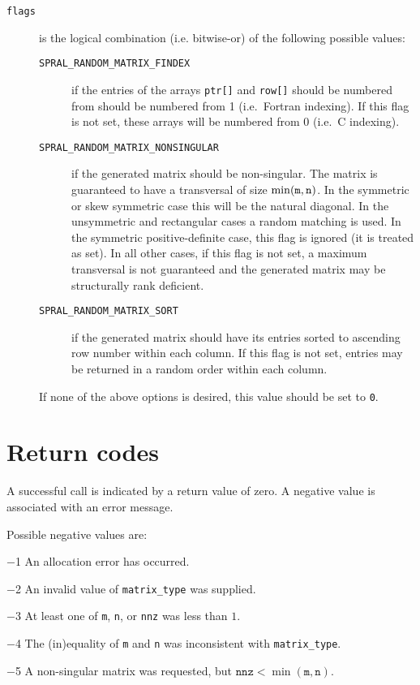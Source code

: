 \begin{description}
\item[\texttt{flags}] is the logical combination (i.e. bitwise-or) of
   the following possible values:
   \begin{description}
      \item[\texttt{SPRAL\_RANDOM\_MATRIX\_FINDEX}] if the entries of the arrays
         \texttt{ptr[]} and \texttt{row[]} should be numbered from should be
         numbered from 1 (i.e.\ Fortran indexing). If this flag is not
         set, these arrays will be numbered from 0 (i.e.\ C indexing).
      \item[\texttt{SPRAL\_RANDOM\_MATRIX\_NONSINGULAR}] if the generated matrix
         should be non-singular. The matrix is guaranteed to have a
         transversal of size $\min({\tt m}, {\tt n})$. In the symmetric or skew
         symmetric case this will be the natural diagonal. In the unsymmetric
         and rectangular cases a random matching is used. In the symmetric
         positive-definite case, this flag is ignored (it is treated as set).
         In all other cases, if this flag is not set, a maximum transversal is
         not guaranteed and the generated matrix may be structurally rank
         deficient.
      \item[\texttt{SPRAL\_RANDOM\_MATRIX\_SORT}] if the generated matrix should
         have its entries sorted to ascending row number within each column. If
         this flag is not set, entries may be returned in a random order within
         each column.
   \end{description}
   If none of the above options is desired, this value should be set to
   \texttt{0}.

\end{description}


\section{Return codes} \label{random_matrix: return values}

A successful call is indicated by a return value of zero.
A negative value is associated with an error message.

Possible negative values are:

\begin{description}
\item{$-$1} An allocation error has occurred.
\item{$-$2} An invalid value of {\tt matrix\_type} was supplied.
\item{$-$3} At least one of {\tt m}, {\tt n}, or {\tt nnz} was less than $1$.
\item{$-$4} The (in)equality of {\tt m} and {\tt n} was inconsistent with
   {\tt matrix\_type}.
\item{$-$5} A non-singular matrix was requested, but $\texttt{nnz}<\min(\texttt{m},\texttt{n})$.
\end{description}

